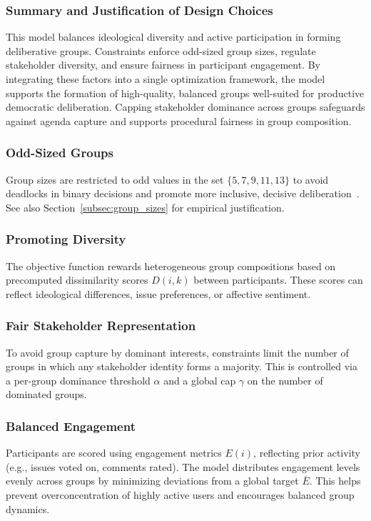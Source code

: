 \subsubsection*{Summary and Justification of Design Choices}

This model balances ideological diversity and active participation in forming deliberative groups.
Constraints enforce odd-sized group sizes, regulate stakeholder diversity, and ensure fairness in participant engagement.
By integrating these factors into a single optimization framework, the model supports the formation of high-quality,
balanced groups well-suited for productive democratic deliberation.
Capping stakeholder dominance across groups safeguards against agenda capture
and supports procedural fairness in group composition.

\subsubsection*{Odd-Sized Groups}
Group sizes are restricted to odd values in the set $\{5,7,9,11,13\}$ to avoid deadlocks in binary decisions
and promote more inclusive, decisive deliberation~\parencite{menon2011oddgroups}.
See also Section~\ref{subsec:group_sizes} for empirical justification.

\subsubsection*{Promoting Diversity}
The objective function rewards heterogeneous group compositions based on precomputed dissimilarity scores $D(i,k)$
between participants. These scores can reflect ideological differences, issue preferences, or affective sentiment.

\subsubsection*{Fair Stakeholder Representation}
To avoid group capture by dominant interests, constraints limit the number of groups
in which any stakeholder identity forms a majority. This is controlled via a per-group dominance threshold $\alpha$
and a global cap $\gamma$ on the number of dominated groups.

\subsubsection*{Balanced Engagement}
Participants are scored using engagement metrics $E(i)$, reflecting prior activity (e.g., issues voted on, comments rated).
The model distributes engagement levels evenly across groups by minimizing deviations from a global target $\bar{E}$.
This helps prevent overconcentration of highly active users and encourages balanced group dynamics.


